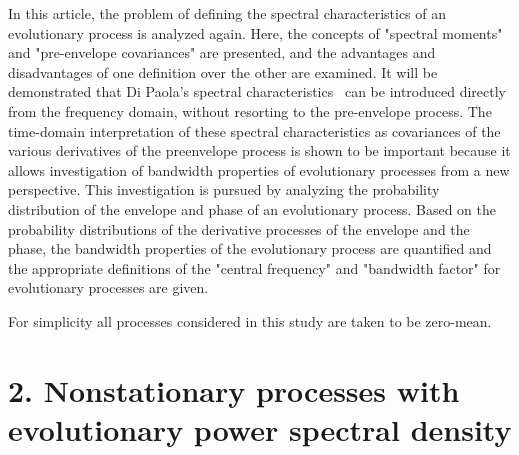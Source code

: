 \documentclass{article}
\begin{document}
In this article, the problem of defining the spectral characteristics of an
evolutionary process is analyzed again. Here, the concepts of "spectral
moments" and "pre-envelope covariances" are presented, and the advantages and
disadvantages of one definition over the other are examined. It will be
demonstrated that Di Paola's spectral characteristics~{\cite{DiPaola1985}} can
be introduced directly from the frequency domain, without resorting to the
pre-envelope process. The time-domain interpretation of these spectral
characteristics as covariances of the various derivatives of the preenvelope
process is shown to be important because it allows investigation of bandwidth
properties of evolutionary processes from a new perspective. This
investigation is pursued by analyzing the probability distribution of the
envelope and phase of an evolutionary process. Based on the probability
distributions of the derivative processes of the envelope and the phase, the
bandwidth properties of the evolutionary process are quantified and the
appropriate definitions of the "central frequency" and "bandwidth factor" for
evolutionary processes are given.

For simplicity all processes considered in this study are taken to be
zero-mean.

\section*{2. Nonstationary processes with evolutionary power spectral density}
\end{document}
